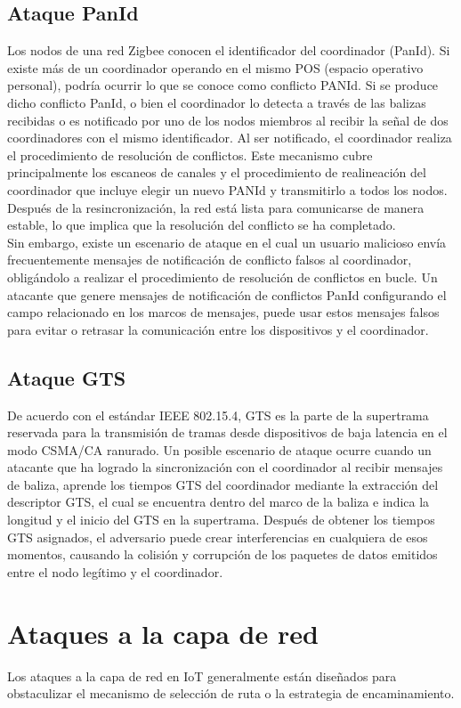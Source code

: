 \subsection{Ataque PanId}
Los nodos de una red Zigbee conocen el identificador del coordinador (PanId). Si existe más de un coordinador operando en el mismo POS (espacio operativo personal), podría ocurrir lo que se conoce como conflicto PANId. Si se produce dicho conflicto PanId, o bien el coordinador lo detecta a través de las balizas recibidas o es notificado por uno de los nodos miembros al recibir la señal de dos coordinadores con el mismo identificador.
Al ser notificado, el coordinador realiza el procedimiento de resolución de conflictos. Este mecanismo cubre principalmente los escaneos de canales y el procedimiento de realineación del coordinador que incluye elegir un nuevo PANId y transmitirlo a todos los nodos. Después de la resincronización, la red está lista para comunicarse de manera estable, lo que implica que la resolución del conflicto se ha completado.
\\Sin embargo, existe un escenario de ataque en el cual un usuario malicioso envía frecuentemente mensajes de notificación de conflicto falsos al coordinador, obligándolo a realizar el procedimiento de resolución de conflictos en bucle. Un atacante que genere mensajes de notificación de conflictos PanId configurando el campo relacionado en los marcos de mensajes, puede usar estos mensajes falsos para evitar o retrasar la comunicación entre los dispositivos y el coordinador.
\subsection{Ataque GTS}
De acuerdo con el estándar IEEE 802.15.4, GTS es la parte de la supertrama reservada para la transmisión de tramas desde dispositivos de baja latencia en el modo CSMA/CA ranurado. Un posible escenario de ataque ocurre cuando un atacante que ha logrado la sincronización con el coordinador al recibir mensajes de baliza, aprende los tiempos GTS del coordinador mediante la extracción del descriptor GTS, el cual se encuentra dentro del marco de la baliza e indica la longitud y el inicio del GTS en la supertrama. Después de obtener los tiempos GTS asignados, el adversario puede crear interferencias en cualquiera de esos momentos, causando la colisión y corrupción de los paquetes de datos emitidos entre el nodo legítimo y el coordinador.
\clearpage



\section{Ataques a la capa de red} %
Los ataques a la capa de red en IoT generalmente están diseñados para obstaculizar el mecanismo de selección de ruta o la estrategia de encaminamiento.
